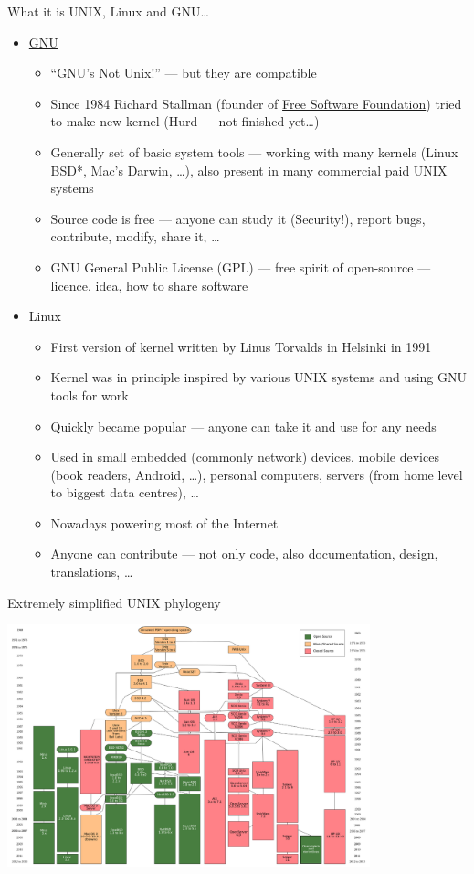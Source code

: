 \documentclass[compress, ucs, xelatex, 11pt, xcolor=svgnames,
  hyperref={
    bookmarks=true,
    unicode=true,
    colorlinks=true,
    pdftitle={Linux, command line and MetaCentrum},
    plainpages=false,
    pdfauthor={Vojtech Zeisek},
    pdfsubject={Course about use of Linux command line, writing shell scripts and using MetaCentrum of CESNET},
    pdfcreator={XeLaTeX, http://www.xelatex.org/},
    pdfkeywords={Linux, GNU, BASH, shell, command line, MetaCentrum},
    linkcolor=Sienna,
    anchorcolor=black,
    citecolor=green,
    filecolor=magenta,
    menucolor=Sienna,
    urlcolor=cyan,
    pdftex},
  url={hyphens, lowtilde} %
  ]{beamer}
\begin{document}
\begin{frame}[allowframebreaks]{What it is UNIX, Linux and GNU\ldots}
\begin{itemize}
\begin{itemize}
  \end{itemize}
  \item \href{https://www.gnu.org/}{GNU}
  \begin{itemize}
    \item ``GNU's Not Unix!'' --- but they are compatible
    \item Since 1984 Richard Stallman (founder of \href{https://www.fsf.org/}{Free Software Foundation}) tried to make new kernel (Hurd --- not finished yet\ldots)
    \item Generally set of basic system tools --- working with many kernels (Linux BSD*, Mac's Darwin, \ldots), also present in many commercial paid UNIX systems
    \item Source code is free --- anyone can study it (Security!), report bugs, contribute, modify, share it, \ldots
    \item GNU General Public License (GPL) --- free spirit of open-source --- licence, idea, how to share software
  \end{itemize}
  \item Linux
  \begin{itemize}
    \item First version of kernel written by Linus Torvalds in Helsinki in 1991
    \item Kernel was in principle inspired by various UNIX systems and using GNU tools for work
    \item Quickly became popular --- anyone can take it and use for any needs
    \item Used in small embedded (commonly network) devices, mobile devices (book readers, Android, \ldots), personal computers, servers (from home level to biggest data centres), \ldots
    \item Nowadays powering most of the Internet
    \item Anyone can contribute --- not only code, also documentation, design, translations, \ldots
  \end{itemize}
\end{itemize}
\end{frame}

\begin{frame}{Extremely simplified UNIX phylogeny}
\begin{center}
  \includegraphics[height=7cm]{unix_history-simple.png}
\end{center}
\end{frame}
\end{document}
